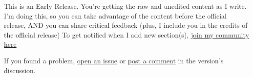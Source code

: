 \begin{warningblock}
    This is an Early Release. You're getting the raw and unedited content as I write. I'm doing this, so you can take advantage of the content
    before the official release, AND you can share critical feedback (plus, I include you in the credits of the official release)
    To get notified when I add new section(s), \href{https://deletosh.com/community}{join my community here}
\end{warningblock}
\begin{importantblock}
    If you found a problem, \href{https://github.com/deletosh/book-CodingForBusyPros/issues}{open an issue} or \href{https://github.com/deletosh/book-CodingForBusyPros/releases}{post a comment} in the version's discussion.
\end{importantblock}


%
%
